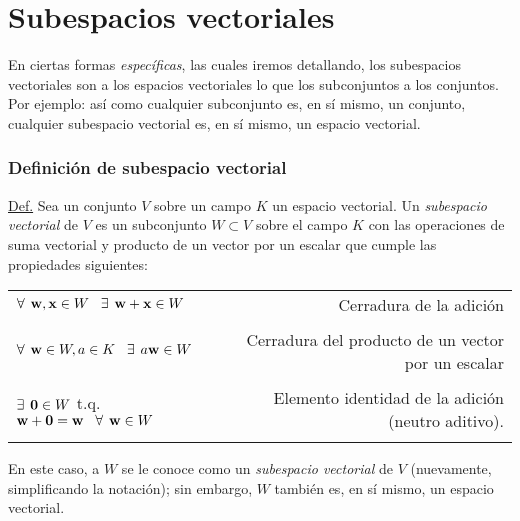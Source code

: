 \documentclass[apuntes]{subfiles}
\begin{document}
\section{Subespacios vectoriales} \label{Subsec:Subespacios_vectoriales}

En ciertas formas \emph{específicas}, las cuales iremos detallando, los subespacios vectoriales son a los espacios vectoriales lo que los subconjuntos a los conjuntos. Por ejemplo: así como cualquier subconjunto es, en sí mismo, un conjunto, cualquier subespacio vectorial es, en sí mismo, un espacio vectorial.

\subsubsection*{Definición de subespacio vectorial} \label{Def:Subespacio_vectorial}

\begin{tcolorbox}
\underline{Def.} Sea un conjunto $V$ sobre un campo $K$ un espacio vectorial. Un \textit{subespacio vectorial} de $V$ es un subconjunto $W\subset V$ sobre el campo $K$ con las operaciones de suma vectorial y producto de un vector por un escalar que cumple las propiedades siguientes:

\begin{center}
\begin{tabular}{lr}
    $\forall\hspace{1.5mm} \mathbf{w},\mathbf{x}\in W \hspace{3mm}\exists \hspace{1.5mm} \mathbf{w}+\mathbf{x}\in W$ & Cerradura de la adición \\ \\ \multirow{2}{0.4\textwidth}{$\forall\hspace{1.5mm} \mathbf{w}\in W, a\in K \hspace{3mm}\exists \hspace{1.5mm} a\mathbf{w}\in W$} & \multirow{2}{0.28\textwidth}{Cerradura del producto de un vector por un escalar} \\ \\ \\
    $\exists \hspace{1.5mm} \mathbf{0}\in W$ t.q. $\mathbf{w}+\mathbf{0}=\mathbf{w}\hspace{3mm}\forall\hspace{1.5mm} \mathbf{w} \in W$ & Elemento identidad de la adición (neutro aditivo). \\ \\
\end{tabular}
\end{center}

\hspace{2.5mm} En este caso, a $W$ se le conoce como un \textit{subespacio vectorial} de $V$ (nuevamente, simplificando la notación); sin embargo, $W$ también es, en sí mismo, un espacio vectorial.

\end{tcolorbox}{}
\end{document}
